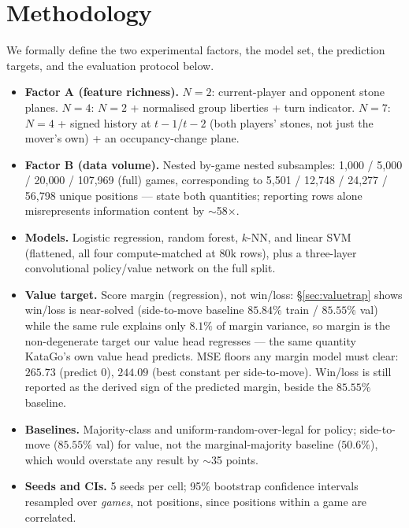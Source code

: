 \documentclass[conference,a4paper]{IEEEtran}
\begin{document}
\section{Methodology}
\label{sec:methodology}
We formally define the two experimental factors, the model set, the
prediction targets, and the evaluation protocol below.
\begin{itemize}
  \item \textbf{Factor A (feature richness).} $N=2$: current-player and
    opponent stone planes. $N=4$: $N=2$ + normalised group liberties +
    turn indicator. $N=7$: $N=4$ + signed history at $t-1$/$t-2$ (both
    players' stones, not just the mover's own) + an occupancy-change plane.
  \item \textbf{Factor B (data volume).} Nested by-game nested subsamples:
    1{,}000 / 5{,}000 / 20{,}000 / 107{,}969 (full) games, corresponding to
    5{,}501 / 12{,}748 / 24{,}277 / 56{,}798 unique positions --- state both
    quantities; reporting rows alone misrepresents information content by
    $\sim$58$\times$.
  \item \textbf{Models.} Logistic regression, random forest, $k$-NN, and
    linear SVM (flattened, all four compute-matched at 80k rows), plus a
    three-layer convolutional policy/value network on the full split.
  \item \textbf{Value target.} Score margin (regression), not win/loss:
    \S\ref{sec:valuetrap} shows win/loss is near-solved (side-to-move
    baseline $85.84\%$ train / $85.55\%$ val) while the same rule explains
    only $8.1\%$ of margin variance, so margin is the non-degenerate target
    our value head regresses --- the same quantity KataGo's own value head
    predicts. MSE floors any margin model must clear: $265.73$ (predict $0$),
    $244.09$ (best constant per side-to-move). Win/loss is still reported as
    the derived sign of the predicted margin, beside the $85.55\%$ baseline.
  \item \textbf{Baselines.} Majority-class and uniform-random-over-legal for
    policy; side-to-move ($85.55\%$ val) for value, not the marginal-majority
    baseline ($50.6\%$), which would overstate any result by $\sim$35 points.
  \item \textbf{Seeds and CIs.} 5 seeds per cell; 95\% bootstrap confidence
    intervals resampled over \emph{games}, not positions, since positions
    within a game are correlated.
\end{itemize}
\end{document}
